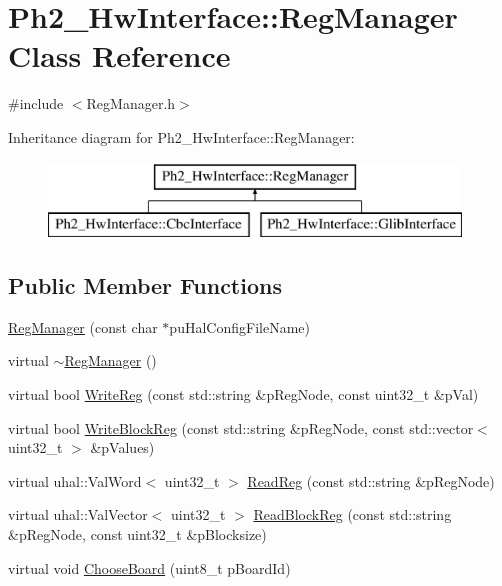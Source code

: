 \hypertarget{class_ph2___hw_interface_1_1_reg_manager}{\section{Ph2\-\_\-\-Hw\-Interface\-:\-:Reg\-Manager Class Reference}
\label{class_ph2___hw_interface_1_1_reg_manager}
}


{\ttfamily \#include $<$Reg\-Manager.\-h$>$}

Inheritance diagram for Ph2\-\_\-\-Hw\-Interface\-:\-:Reg\-Manager\-:\begin{figure}[H]
\begin{center}
\leavevmode
\includegraphics[height=2.000000cm]{class_ph2___hw_interface_1_1_reg_manager}
\end{center}
\end{figure}
\subsection*{Public Member Functions}
\begin{DoxyCompactItemize}
\item 
\hyperlink{class_ph2___hw_interface_1_1_reg_manager_a938f6b582b1fffcb478f35fd9d81954f}{Reg\-Manager} (const char $\ast$pu\-Hal\-Config\-File\-Name)
\item 
virtual \hyperlink{class_ph2___hw_interface_1_1_reg_manager_a5d650c4e6467153f98f999abbbfc354c}{$\sim$\-Reg\-Manager} ()
\item 
virtual bool \hyperlink{class_ph2___hw_interface_1_1_reg_manager_a31174516fef6706c88c3f59dd93e4fdf}{Write\-Reg} (const std\-::string \&p\-Reg\-Node, const uint32\-\_\-t \&p\-Val)
\item 
virtual bool \hyperlink{class_ph2___hw_interface_1_1_reg_manager_a888f5cccb05daa28896cf622abfdcbd6}{Write\-Block\-Reg} (const std\-::string \&p\-Reg\-Node, const std\-::vector$<$ uint32\-\_\-t $>$ \&p\-Values)
\item 
virtual uhal\-::\-Val\-Word$<$ uint32\-\_\-t $>$ \hyperlink{class_ph2___hw_interface_1_1_reg_manager_a077e0a18592206365150680213345112}{Read\-Reg} (const std\-::string \&p\-Reg\-Node)
\item 
virtual uhal\-::\-Val\-Vector$<$ uint32\-\_\-t $>$ \hyperlink{class_ph2___hw_interface_1_1_reg_manager_a6481c211d27badc409ff0e7af20575e4}{Read\-Block\-Reg} (const std\-::string \&p\-Reg\-Node, const uint32\-\_\-t \&p\-Blocksize)
\item 
virtual void \hyperlink{class_ph2___hw_interface_1_1_reg_manager_a20c502bcad5115c6ae16d4d356b72f0c}{Choose\-Board} (uint8\-\_\-t p\-Board\-Id)
\end{DoxyCompactItemize}
